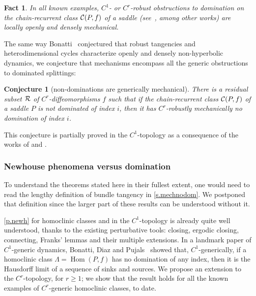 \documentclass[11pt, a4paper]{amsart}
\theoremstyle{plain}
\newtheorem{conjecture}{Conjecture}[proposition]
\newtheorem*{fact}{Fact}
\theoremstyle{definition}
\theoremstyle{remark}
\numberwithin{equation}{section}         %
\def\Hom{\operatorname{Hom}}
\begin{document}
\begin{fact}
In all known examples, $C^1$- or $C^r$-robust obstructions to domination on the chain-recurrent class ${\mathcal C}(P,f)$ of a saddle (see~\cite{N1,N2,PV,GST1,GST3,BD}, among other works) are locally openly and densely mechanical.
\end{fact}

The same way Bonatti~\cite{B} conjectured that robust tangencies and heterodimensional cycles  characterize openly and densely non-hyperbolic dynamics, we conjecture that mechanisms encompass all the generic obstructions to dominated splittings:

\begin{conjecture}[non-dominations are generically mechanical]
There is a residual subset ${\mathcal R}$ of $C^r$-diffeomorphisms $f$ such that if the chain-recurrent class ${\mathcal C}(P,f)$ of a saddle $P$ is not dominated of index $i$, then it has $C^r$-robustly mechanically no domination of index $i$.
\end{conjecture}

This conjecture is partially proved in the $C^1$-topology as a consequence of the works of \cite{BC1} and \cite{BCDG}.


\subsubsection{Newhouse phenomena versus domination}
\label{s.Newhphdom}

To understand the theorems stated here in their fullest extent, one would need to read the lengthy definition of bundle tangency in \cref{s.mechnodom}. We postponed that definition since the larger part of these results can be understood without it. 

\medskip

 \cref{p.newh} for homoclinic classes and in the $C^1$-topology is already quite well understood, thanks to the existing perturbative tools: closing, ergodic closing, connecting, Franks' lemmas and their multiple extensions.
In a landmark paper of $C^1$-generic dynamics, Bonatti, Diaz and Pujals~\cite{BDP} showed that, $C^1$-generically, if a homoclinic class $\Lambda=\Hom(P,f)$ has no domination of any index, then it is the Hausdorff limit of a sequence of sinks and sources. 
We propose an extension to the $C^r$-topology, for $r\geq 1$; we show that the result holds for all the known examples of $C^r$-generic homoclinic classes, to date. 
\end{document}
